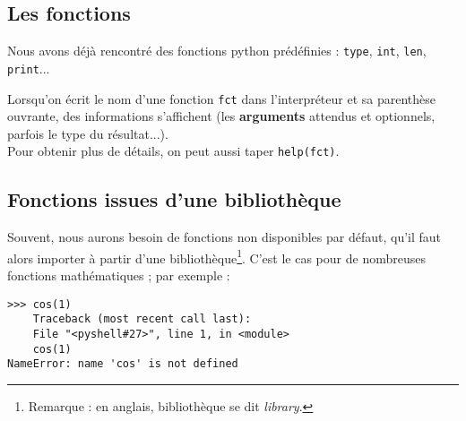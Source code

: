 \ifprof
\vspace{1cm}
\else
\begin{multicols}{2}
\fi



\section*{Les fonctions}
Nous avons déjà rencontré des fonctions python prédéfinies : \texttt{type}, \texttt{int}, \texttt{len}, \texttt{print}... 

Lorsqu'on écrit le nom d'une fonction \texttt{fct} dans l'interpréteur et sa parenthèse ouvrante, des informations s'affichent (les \textbf{arguments} attendus et optionnels, parfois le type du résultat...). \\
Pour obtenir plus de détails, on peut aussi taper \texttt{help(fct)}.

\exer{}









\subsection*{Fonctions issues d'une bibliothèque}
Souvent, nous aurons besoin de fonctions non disponibles par défaut, qu'il faut alors importer à partir d'une bibliothèque\footnote{Remarque : en anglais, bibliothèque se dit \emph{library}.}. C'est le cas pour de nombreuses fonctions mathématiques ; par exemple : 
\begin{lstlisting} 
>>> cos(1)
	Traceback (most recent call last):
	File "<pyshell#27>", line 1, in <module>
 	cos(1)
NameError: name 'cos' is not defined
\end{lstlisting}


\end{multicols}
